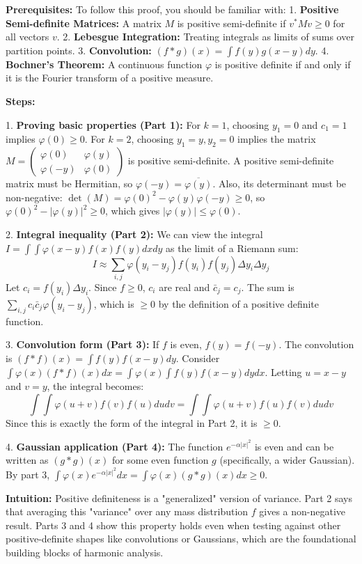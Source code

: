 \begin{solution}
\textbf{Prerequisites:}
To follow this proof, you should be familiar with:
1. \textbf{Positive Semi-definite Matrices:} A matrix $M$ is positive semi-definite if $v^* M v \geq 0$ for all vectors $v$.
2. \textbf{Lebesgue Integration:} Treating integrals as limits of sums over partition points.
3. \textbf{Convolution:} $(f * g)(x) = \int f(y) g(x-y) dy$.
4. \textbf{Bochner's Theorem:} A continuous function $\varphi$ is positive definite if and only if it is the Fourier transform of a positive measure.

\textbf{Steps:}

1. \textbf{Proving basic properties (Part 1):}
For $k=1$, choosing $y_1=0$ and $c_1=1$ implies $\varphi(0) \geq 0$.
For $k=2$, choosing $y_1=y, y_2=0$ implies the matrix $M = \begin{pmatrix} \varphi(0) & \varphi(y) \\ \varphi(-y) & \varphi(0) \end{pmatrix}$ is positive semi-definite.
A positive semi-definite matrix must be Hermitian, so $\varphi(-y) = \overline{\varphi(y)}$.
Also, its determinant must be non-negative: $\det(M) = \varphi(0)^2 - \varphi(y)\varphi(-y) \geq 0$, so $\varphi(0)^2 - |\varphi(y)|^2 \geq 0$, which gives $|\varphi(y)| \leq \varphi(0)$.

2. \textbf{Integral inequality (Part 2):}
We can view the integral $I = \int \int \varphi(x-y) f(x) f(y) dx dy$ as the limit of a Riemann sum:
\[ I \approx \sum_{i,j} \varphi(y_i - y_j) f(y_i) f(y_j) \Delta y_i \Delta y_j \]
Let $c_i = f(y_i) \Delta y_i$. Since $f \geq 0$, $c_i$ are real and $\bar{c}_j = c_j$. The sum is $\sum_{i,j} c_i \bar{c}_j \varphi(y_i - y_j)$, which is $\geq 0$ by the definition of a positive definite function.

3. \textbf{Convolution form (Part 3):}
If $f$ is even, $f(y) = f(-y)$. The convolution is $(f * f)(x) = \int f(y) f(x-y) dy$.
Consider $\int \varphi(x) (f * f)(x) dx = \int \varphi(x) \int f(y) f(x-y) dy dx$.
Letting $u = x-y$ and $v = y$, the integral becomes:
\[ \int \int \varphi(u+v) f(v) f(u) du dv = \int \int \varphi(u+v) f(u) f(v) du dv \]
Since this is exactly the form of the integral in Part 2, it is $\geq 0$.

4. \textbf{Gaussian application (Part 4):}
The function $e^{-\alpha |x|^2}$ is even and can be written as $(g * g)(x)$ for some even function $g$ (specifically, a wider Gaussian). By part 3, $\int \varphi(x) e^{-\alpha |x|^2} dx = \int \varphi(x) (g * g)(x) dx \geq 0$.

\textbf{Intuition:}
Positive definiteness is a "generalized" version of variance. Part 2 says that averaging this "variance" over any mass distribution $f$ gives a non-negative result. Parts 3 and 4 show this property holds even when testing against other positive-definite shapes like convolutions or Gaussians, which are the foundational building blocks of harmonic analysis.
\end{solution}

